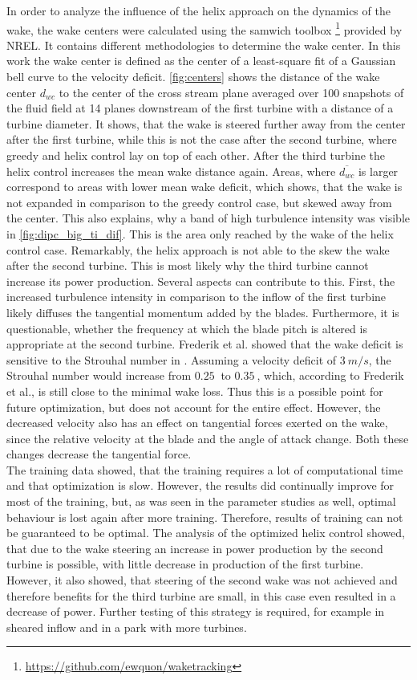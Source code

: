 In order to analyze the influence of the helix approach on the dynamics of the wake, the wake centers were calculated using the samwich toolbox \footnote{\url{https://github.com/ewquon/waketracking}} provided by NREL. It contains different methodologies to determine the wake center. In this work the wake center is defined as the center of a least-square fit of a Gaussian bell curve to the velocity deficit. \autoref{fig:centers} shows the distance of the wake center $d_{wc}$ to the center of the cross stream plane averaged over 100 snapshots of the fluid field at 14 planes downstream of the first turbine with a distance of a turbine diameter. It shows, that the wake is steered further away from the center after the first turbine, while this is not the case after the second turbine, where greedy and helix control lay on top of each other. After the third turbine the helix control increases the mean wake distance again. Areas, where $\overline{d_{wc}}$ is larger correspond to areas with lower mean wake deficit, which shows, that the wake is not expanded in comparison to the greedy control case, but skewed away from the center. This also explains, why a band of high turbulence intensity was visible in \autoref{fig:dipc_big_ti_dif}. This is the area only reached by the wake of the helix control case. Remarkably, the helix approach is not able to the skew the wake after the second turbine. This is most likely why the third turbine cannot increase its power production. Several aspects can contribute to this. First, the increased turbulence intensity in comparison to the inflow of the first turbine likely diffuses the tangential momentum added by the blades. Furthermore, it is questionable, whether the frequency at which the blade pitch is altered is appropriate at the second turbine. Frederik et al. showed that the wake deficit is sensitive to the Strouhal number in \cite{frederik_helix_2020}. Assuming a velocity deficit of $\SI{3}{m/s}$, the Strouhal number would increase from $\SI{0.25}{}$ to $\SI{0.35}{}$, which, according to Frederik et al., is still close to the minimal wake loss. Thus this is a possible point for future optimization, but does not account for the entire effect. However, the decreased velocity also has an effect on tangential forces exerted on the wake, since the relative velocity at the blade and the angle of attack change. Both these changes decrease the tangential force. \\
The training data showed, that the training requires a lot of computational time and that optimization is slow. However, the results did continually improve for most of the training, but, as was seen in the parameter studies as well, optimal behaviour is lost again after more training. Therefore, results of training can not be guaranteed to be optimal. The analysis of the optimized helix control showed, that due to the wake steering an increase in power production by the second turbine is possible, with little decrease in production of the first turbine. However, it also showed, that steering of the second wake was not achieved and therefore benefits for the third turbine are small, in this case even resulted in a decrease of power. Further testing of this strategy is required, for example in sheared inflow and in a park with more turbines. \\
